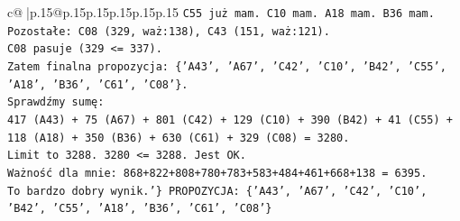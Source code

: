 \documentclass{article}
\begin{document}
{\begin{supertabular}{c@{$\;$}|p{.15\linewidth}@{}p{.15\linewidth}p{.15\linewidth}p{.15\linewidth}p{.15\linewidth}p{.15\linewidth}}
{{{\texttt{C55 już mam. C10 mam. A18 mam. B36 mam.} \\
\texttt{Pozostałe: C08 (329, waż:138), C43 (151, waż:121).} \\
\texttt{C08 pasuje (329 <= 337).} \\
\texttt{Zatem finalna propozycja: \{'A43', 'A67', 'C42', 'C10', 'B42', 'C55', 'A18', 'B36', 'C61', 'C08'\}.} \\
\texttt{Sprawdźmy sumę:} \\
\texttt{417 (A43) + 75 (A67) + 801 (C42) + 129 (C10) + 390 (B42) + 41 (C55) + 118 (A18) + 350 (B36) + 630 (C61) + 329 (C08) = 3280.} \\
\texttt{Limit to 3288. 3280 <= 3288. Jest OK.} \\
\texttt{Ważność dla mnie: 868+822+808+780+783+583+484+461+668+138 = 6395.} \\
\texttt{To bardzo dobry wynik.'\} PROPOZYCJA: \{'A43', 'A67', 'C42', 'C10', 'B42', 'C55', 'A18', 'B36', 'C61', 'C08'\}} \\
            }
        }
    }
     \\ \\


\end{supertabular}}
\end{document}
